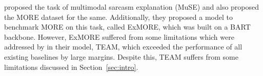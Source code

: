 \citet{Desai_Chakraborty_Akhtar_2022} proposed the task of multimodal sarcasm explanation (MuSE) and also proposed the MORE dataset for the same. Additionally, they proposed a model to benchmark MORE on this task, called ExMORE, which was built on a BART \citep{lewis-etal-2020-bart} backbone. 
However, ExMORE suffered from some limitations which were addressed by \citet{jing-etal-2023-multi} in their model, TEAM, which exceeded the performance of all existing baselines by large margins. Despite this, TEAM suffers from some limitations discussed in Section~\ref{sec:intro}. 